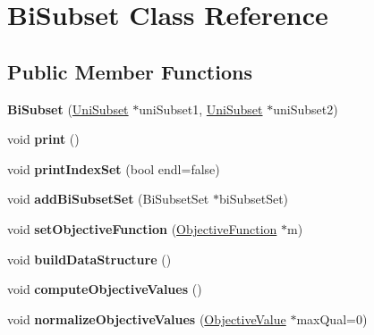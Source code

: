 \hypertarget{classBiSubset}{\section{Bi\-Subset Class Reference}
\label{classBiSubset}
}
\subsection*{Public Member Functions}
\begin{DoxyCompactItemize}
\item 
\hypertarget{classBiSubset_a72dab80dd500f97f37b85978fcd0e215}{{\bfseries Bi\-Subset} (\hyperlink{classUniSubset}{Uni\-Subset} $\ast$uni\-Subset1, \hyperlink{classUniSubset}{Uni\-Subset} $\ast$uni\-Subset2)}\label{classBiSubset_a72dab80dd500f97f37b85978fcd0e215}

\item 
\hypertarget{classBiSubset_a9e2244b5abe28961262331d4552f349b}{void {\bfseries print} ()}\label{classBiSubset_a9e2244b5abe28961262331d4552f349b}

\item 
\hypertarget{classBiSubset_abd1cc08db6ce34f7ac8a25ca2d752561}{void {\bfseries print\-Index\-Set} (bool endl=false)}\label{classBiSubset_abd1cc08db6ce34f7ac8a25ca2d752561}

\item 
\hypertarget{classBiSubset_aeb28fe63a6de896ca68ac0729febd553}{void {\bfseries add\-Bi\-Subset\-Set} (Bi\-Subset\-Set $\ast$bi\-Subset\-Set)}\label{classBiSubset_aeb28fe63a6de896ca68ac0729febd553}

\item 
\hypertarget{classBiSubset_a4ac853c296b879fc071568aa86c9b2b7}{void {\bfseries set\-Objective\-Function} (\hyperlink{classObjectiveFunction}{Objective\-Function} $\ast$m)}\label{classBiSubset_a4ac853c296b879fc071568aa86c9b2b7}

\item 
\hypertarget{classBiSubset_ac78205261912722ccae75e1ca8c8ff68}{void {\bfseries build\-Data\-Structure} ()}\label{classBiSubset_ac78205261912722ccae75e1ca8c8ff68}

\item 
\hypertarget{classBiSubset_ac815043eae3451a4aacc76e7324dd445}{void {\bfseries compute\-Objective\-Values} ()}\label{classBiSubset_ac815043eae3451a4aacc76e7324dd445}

\item 
\hypertarget{classBiSubset_a9671b38670ed6a9e25cb2afaf606a4ee}{void {\bfseries normalize\-Objective\-Values} (\hyperlink{classObjectiveValue}{Objective\-Value} $\ast$max\-Qual=0)}\label{classBiSubset_a9671b38670ed6a9e25cb2afaf606a4ee}


\end{DoxyCompactItemize}
